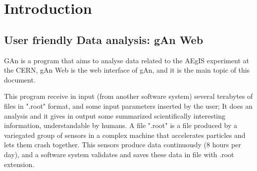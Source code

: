 
\chapter{Introduction} %

\label{Chapter1} %


\section{User friendly Data analysis: gAn Web}

GAn is a program that aims to analyse data related to the AEgIS experiment at the CERN, gAn Web is the web interface of gAn, and it is the main topic of this document.
 
This program receive in input (from another software system) several terabytes of files in ".root" format, and some input parameters inserted by the user; 
It does an analysis and it gives in output some summarized scientifically interesting information, understandable by humans.   
A file ".root" is a file produced by a variegated group of sensors in a complex machine that accelerates particles and lets them crash together. This sensors produce data continuously (8 hours per day), and a software system validates and saves these data in file with .root extension. 

